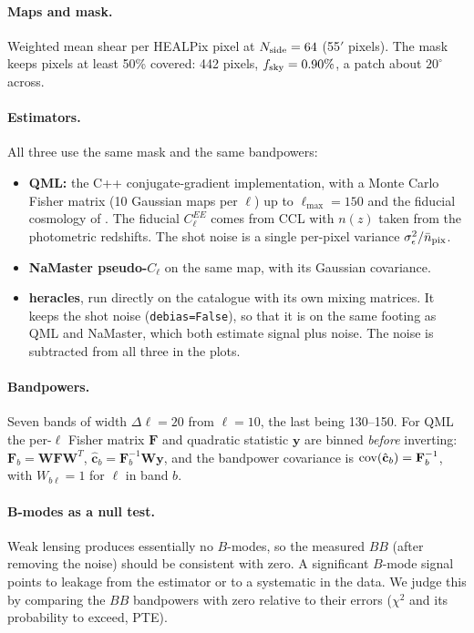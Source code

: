\documentclass[11pt]{article}
\begin{document}
\paragraph{Maps and mask.} Weighted mean shear per HEALPix pixel at $N_{\rm side}=64$ (55$'$ pixels). The mask
keeps pixels at least 50\% covered: 442 pixels, $f_{\rm sky}=0.90\%$, a patch about $20^\circ$ across.

\paragraph{Estimators.} All three use the same mask and the same bandpowers:
\begin{itemize}
\item \textbf{QML:} the C++ conjugate-gradient implementation, with a Monte Carlo Fisher matrix (10 Gaussian maps per
$\ell$) up to $\ell_{\max}=150$ and the fiducial cosmology of \citet{Maraio2022}. The fiducial $C^{EE}_\ell$ comes from
CCL with $n(z)$ taken from the photometric redshifts. The shot noise is a single per-pixel variance
$\sigma_\epsilon^2/\bar n_{\rm pix}$.
\item \textbf{NaMaster pseudo-$C_\ell$} on the same map, with its Gaussian covariance.
\item \textbf{heracles}, run directly on the catalogue with its own mixing matrices. It keeps the shot noise
(\texttt{debias=False}), so that it is on the same footing as QML and NaMaster, which both estimate signal plus
noise. The noise is subtracted from all three in the plots.
\end{itemize}

\paragraph{Bandpowers.} Seven bands of width $\Delta\ell=20$ from $\ell=10$, the last being 130--150. For QML the
per-$\ell$ Fisher matrix $\mathbf F$ and quadratic statistic $\mathbf y$ are binned \emph{before} inverting:
$\mathbf F_b=\mathbf W\mathbf F\mathbf W^{T}$, $\hat{\mathbf c}_b=\mathbf F_b^{-1}\mathbf W\mathbf y$, and the bandpower
covariance is ${\rm cov}(\hat{\mathbf c}_b)=\mathbf F_b^{-1}$, with $W_{b\ell}=1$ for $\ell$ in band $b$.

\paragraph{B-modes as a null test.} Weak lensing produces essentially no $B$-modes, so the measured $BB$ (after
removing the noise) should be consistent with zero. A significant $B$-mode signal points to leakage from the
estimator or to a systematic in the data. We judge this by comparing the $BB$ bandpowers with zero relative to their
errors ($\chi^2$ and its probability to exceed, PTE).
\end{document}
